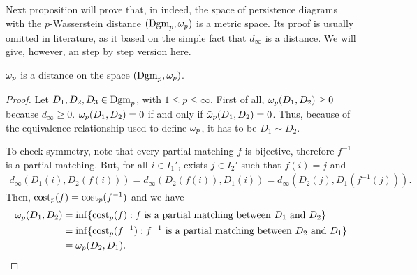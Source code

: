 Next proposition will prove that, in indeed, the space of persistence diagrams with the $p$-Wasserstein distance $(\operatorname{Dgm}_p, \omega_p)$ is a metric space. Its proof is usually omitted in literature, as it based on the simple fact that $ d_\infty $ is a distance. We will give, however, an step by step version here.

\begin{proposition} \label{prop:wasserstein-is-distance}
    $\omega_p$ is a distance on the space $ (\operatorname{Dgm}_p, \omega_p) $.
\end{proposition}
\begin{proof}
    Let $ D_1, D_2, D_3 \in \operatorname{Dgm}_p$, with $ 1 \leq p \leq \infty $. First of all, $ \omega_p (D_1, D_2) \geq 0 $ because $ d_\infty \geq 0 $. $ \omega_p (D_1, D_2) = 0 $ if and only if $ \tilde \omega_p (D_1, D_2) = 0 $. Thus, because of the equivalence relationship used to define $ \omega_p $, it has to be $ D_1 \sim D_2 $.

    To check symmetry, note that every partial matching $ f $ is bijective, therefore $ f^{-1} $ is a partial matching. But, for all $ i \in I_1'$, exists $ j \in I_2' $ such that $ f(i) = j $ and
    \begin{align}
        d_\infty (D_1(i), D_2(f(i))) = d_\infty (D_2(f(i)), D_1(i)) = d_\infty (D_2(j), D_1(f^{-1}(j))).
    \end{align}
    Then, $ \operatorname{cost}_p(f) = \operatorname{cost}_p(f^{-1}) $ and we have
    \begin{align}
        \omega_p (D_1, D_2) &= \inf \{\operatorname{cost}_p(f) : f \text{ is a partial matching between } D_1 \text{ and } D_2 \} \\
        &= \inf \{\operatorname{cost}_p(f^{-1}) : f^{-1} \text{ is a partial matching between } D_2 \text{ and } D_1 \} \\
        &= \omega_p (D_2, D_1).
    \end{align}
    

\end{proof}
